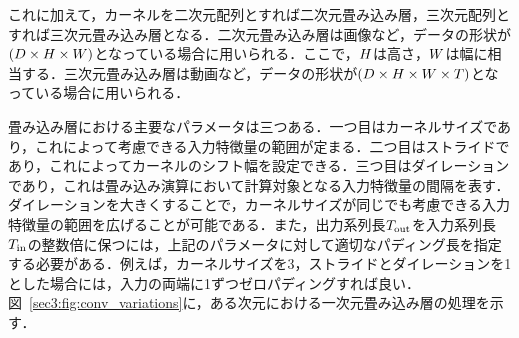 \documentclass[12pt]{jarticle}
\numberwithin{equation}{section}    %
\numberwithin{figure}{section}      %
\numberwithin{table}{section}      %
\begin{document}
これに加えて，カーネルを二次元配列とすれば二次元畳み込み層，三次元配列とすれば三次元畳み込み層となる．二次元畳み込み層は画像など，データの形状が$(D \times H \times W)$となっている場合に用いられる．ここで，$H$は高さ，$W$は幅に相当する．三次元畳み込み層は動画など，データの形状が$(D \times H \times W \times T)$となっている場合に用いられる．

畳み込み層における主要なパラメータは三つある．一つ目はカーネルサイズであり，これによって考慮できる入力特徴量の範囲が定まる．二つ目はストライドであり，これによってカーネルのシフト幅を設定できる．三つ目はダイレーションであり，これは畳み込み演算において計算対象となる入力特徴量の間隔を表す．ダイレーションを大きくすることで，カーネルサイズが同じでも考慮できる入力特徴量の範囲を広げることが可能である．また，出力系列長$T_{\text{out}}$を入力系列長$T_{\text{in}}$の整数倍に保つには，上記のパラメータに対して適切なパディング長を指定する必要がある．例えば，カーネルサイズを3，ストライドとダイレーションを1とした場合には，入力の両端に1ずつゼロパディングすれば良い．図~\ref{sec3:fig:conv_variations}に，ある次元における一次元畳み込み層の処理を示す．
\end{document}
